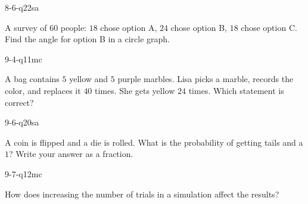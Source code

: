 \begin{practiceQuestion}{8-6-q22}{sa}
\begin{questionText}
A survey of $60$ people: $18$ chose option A, $24$ chose option B, $18$ chose option C. Find the angle for option B in a circle graph.
\end{questionText}
\end{practiceQuestion}

\begin{practiceQuestion}{9-4-q11}{mc}
\begin{questionText}
A bag contains $5$ yellow and $5$ purple marbles. Lisa picks a marble, records the color, and replaces it $40$ times. She gets yellow $24$ times. Which statement is correct?
\end{questionText}
\end{practiceQuestion}

\begin{practiceQuestion}{9-6-q20}{sa}
\begin{questionText}
A coin is flipped and a die is rolled. What is the probability of getting tails and a $1$? Write your answer as a fraction.
\end{questionText}
\end{practiceQuestion}

\begin{practiceQuestion}{9-7-q12}{mc}
\begin{questionText}
How does increasing the number of trials in a simulation affect the results?
\end{questionText}
\end{practiceQuestion}
